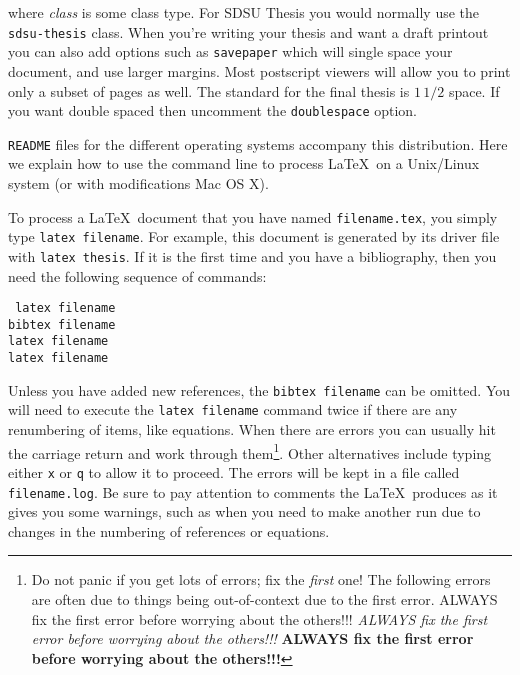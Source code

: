 \noindent
where \emph{class} is some class type.  For SDSU Thesis you would
normally use the \texttt{sdsu-thesis} class.  When you're writing your
thesis and want a draft printout you can also add options such as
\texttt{savepaper} which will single space your document, and use
larger margins.  Most postscript viewers will allow you to print only
a subset of pages as well.  The standard for the final thesis is $1
\,1/2$ space.  If you want double spaced then uncomment the
\texttt{doublespace} option.

\verb+README+ files for the different operating systems accompany this
distribution.  Here we explain how to use the command line to process
\LaTeX\ on a Unix/Linux system (or with modifications Mac OS X).

To process a \LaTeX\ document that you have named
\texttt{filename.tex}, you simply type \texttt{latex filename}. For
example, this document is generated by its driver file with
\texttt{latex thesis}. If it is the first time and you have a
bibliography, then you need the following sequence of commands:
\vspace{.15in}

\noindent\texttt{%
  \ssp %
  \hspace*{5em}latex filename\\  
  \hspace*{5em}bibtex filename\\
  \hspace*{5em}latex filename\\
  \hspace*{5em}latex filename\\
}
\vspace{.15in}

\noindent
Unless you have added new references, the \texttt{bibtex filename} can
be omitted. You will need to execute the \texttt{latex filename}
command twice if there are any renumbering of items, like
equations. When there are errors you can usually hit the carriage
return and work through them\footnote{Do not panic if you get lots of
  errors; fix the \emph{first} one!  The following errors are often
  due to things being out-of-context due to the first error. ALWAYS
  fix the first error before worrying about the others!!!  \emph{ALWAYS
    fix the first error before worrying about the others!!!}
  \textbf{ALWAYS fix the first error before worrying about the
    others!!!}}.  Other alternatives include typing either \texttt{x}
or \texttt{q} to allow it to proceed. The errors will be kept in a
file called \texttt{filename.log}.  Be sure to pay attention to
comments the \LaTeX\ produces as it gives you some warnings, such as
when you need to make another run due to changes in the numbering of
references or equations.

